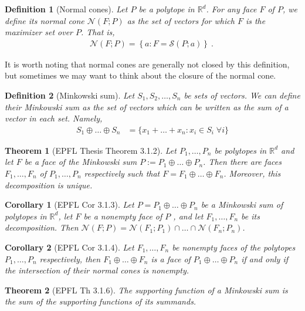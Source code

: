 \documentclass[12pt]{article}
\newcommand{\reals}{\mathbb{R}}
\newcommand{\N}{\mathcal{N}}
\newtheorem{theorem}{Theorem}
\newtheorem{definition}{Definition}
\newtheorem{corollary}{Corollary}
\begin{document}
\begin{definition}[Normal cones]
  Let $P$ be a polytope in $\reals^d$.
  For any face $F$ of $P$, we define its \emph{normal cone} $\N(F;P)$ as the set of vectors for which $F$ is the maximizer set over $P$.
  That is,
  \begin{align*}
    \N(F;P) = \left\{a : F = \mathcal{S}(P; a) \right\}~.~
  \end{align*}
\end{definition}

  It is worth noting that normal cones are generally not closed by this definition, but sometimes we may want to think about the closure of the normal cone.

\begin{definition}[Minkowski sum]
	Let $S_1, S_2, \ldots, S_n$ be sets of vectors.
	We can define their \emph{Minkowski sum} as the set of vectors which can be written as the sum of a vector in each set.
	Namely,
	\begin{align*}
	S_1 \oplus \ldots \oplus S_n &= \{x_1 + \ldots + x_n : x_i \in S_i \; \forall i \}
	\end{align*}
\end{definition}

\begin{theorem}[EPFL Thesis Theorem 3.1.2]
	Let $P_1, \ldots, P_n$ be polytopes in $\reals^d$ and let $F$ be a face of the Minkowski sum $P := P_1 \oplus \ldots \oplus P_n$.
	Then there are faces $F_1, \ldots, F_n$ of $P_1, \ldots, P_n$ respectively such that $F = F_1 \oplus \ldots \oplus F_n$.
	Moreover, this decomposition is unique.
\end{theorem}

\begin{corollary}[EPFL Cor 3.1.3]\label{cor:face-decomp-normal-cones}
  Let $P = P_1 \oplus \ldots \oplus P_n$ be a Minkowski sum of polytopes in $\reals^d$, let $F$ be a nonempty face of $P$ , and let $F_1, \ldots, F_n$ be its decomposition.
  Then $\N(F;P) = \N(F_1;P_1) \cap \ldots \cap \N(F_n; P_n)$.
\end{corollary}

\begin{corollary}[EPFL Cor 3.1.4]
  Let $F_1, \ldots, F_n$ be nonempty faces of the polytopes $P_1, \ldots, P_n$ respectively, then $F_1 \oplus \ldots \oplus F_n$ is a face of $P_1 \oplus \ldots \oplus P_n$ if and only if the intersection of their normal cones is nonempty.
\end{corollary}

\begin{theorem}[EPFL Th 3.1.6]\label{thm:support-minksum}
  The supporting function of a Minkowski sum is the sum of the supporting functions of its summands.
\end{theorem}
\end{document}
